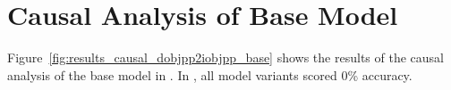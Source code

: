 \section{Causal Analysis of Base Model}
\label{sec:causal_base}

Figure~\ref{fig:results_causal_dobjpp2iobjpp_base} shows the results of the causal analysis of the base model in \dobjppiobjpp{}.
In \dobjppsubjpp{}, all model variants scored 0\% accuracy.